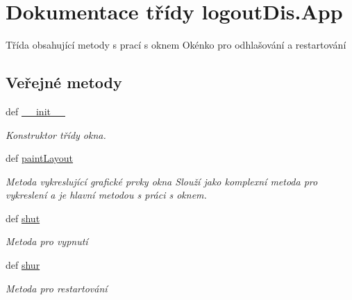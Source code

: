 \hypertarget{classlogoutDis_1_1App}{\section{Dokumentace třídy logout\-Dis.\-App}
\label{d9/d5a/classlogoutDis_1_1App}
}


Třída obsahující metody s prací s oknem Okénko pro odhlašování a restartování  


\subsection*{Veřejné metody}
\begin{DoxyCompactItemize}
\item 
def \hyperlink{classlogoutDis_1_1App_abdea5b146ac15f16e3c179583eaebafa}{\-\_\-\-\_\-init\-\_\-\-\_\-}
\begin{DoxyCompactList}\small\item\em Konstruktor třídy okna. \end{DoxyCompactList}\item 
def \hyperlink{classlogoutDis_1_1App_a9bc09dd5c702c80b4cba428d59bbf9c5}{paint\-Layout}
\begin{DoxyCompactList}\small\item\em Metoda vykreslující grafické prvky okna Slouží jako komplexní metoda pro vykreslení a je hlavní metodou s práci s oknem. \end{DoxyCompactList}\item 
def \hyperlink{classlogoutDis_1_1App_ad5aafe1ce8c3cebe625780595fd0a3bd}{shut}
\begin{DoxyCompactList}\small\item\em Metoda pro vypnutí \end{DoxyCompactList}\item 
def \hyperlink{classlogoutDis_1_1App_a1e2930c579a7ec2a4a97f8979724461d}{shur}
\begin{DoxyCompactList}\small\item\em Metoda pro restartování \end{DoxyCompactList}\end{DoxyCompactItemize}
